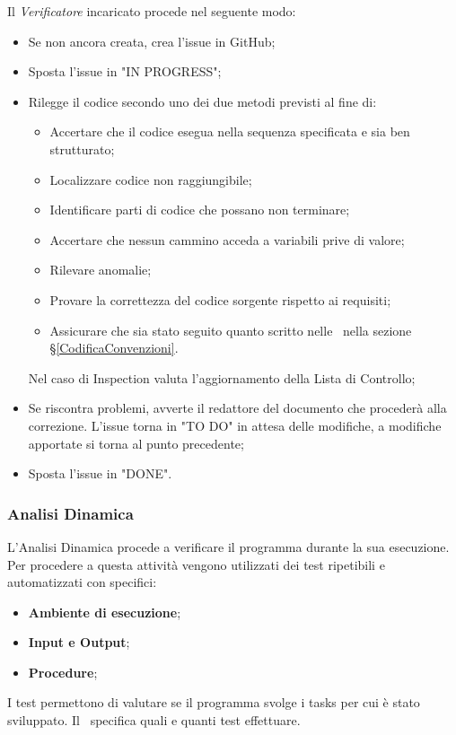 Il \textit{Verificatore} incaricato procede nel seguente modo:
\begin{itemize}
	\item Se non ancora creata, crea l'issue in GitHub;
	\item Sposta l'issue in "IN PROGRESS";
	\item Rilegge il codice secondo uno dei due metodi previsti al fine di:
	\begin{itemize}
		\item Accertare che il codice esegua nella sequenza specificata e sia ben strutturato;
		\item Localizzare codice non raggiungibile;
		\item Identificare parti di codice che possano non terminare;
		\item Accertare che nessun cammino acceda a variabili prive di valore;
		\item Rilevare anomalie;
		\item Provare la correttezza del codice sorgente rispetto ai requisiti;
		\item Assicurare che sia stato seguito quanto scritto nelle \NdPv{}\ nella sezione \S\ref{CodificaConvenzioni}.
	\end{itemize}
	 Nel caso di Inspection valuta l'aggiornamento della Lista di Controllo;
	\item Se riscontra problemi, avverte il redattore del documento che procederà alla correzione. L'issue torna in "TO DO" in attesa delle modifiche, a modifiche apportate si torna al punto precedente;
	\item Sposta l'issue in "DONE".
\end{itemize}

\subsubsection{Analisi Dinamica}
L'Analisi Dinamica procede a verificare il programma durante la sua esecuzione. Per procedere a questa attività vengono utilizzati dei test ripetibili e automatizzati con specifici:
\begin{itemize}
	\item \textbf{Ambiente di esecuzione};
	\item \textbf{Input e Output};
	\item \textbf{Procedure};
\end{itemize}

\label{Tests}
I test permettono di valutare se il programma svolge i tasks per cui è stato sviluppato. Il \PdQv{}\ specifica quali e quanti test effettuare.
